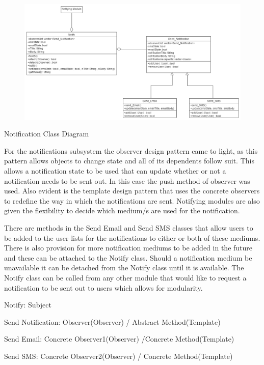 \documentclass{article}
\begin{document}
    \begin{figure}[h!]
      \includegraphics[width=\textwidth]{Notifications_Class_Diagram.png}
    \end{figure}
    Notification Class Diagram
    
    \begin{flushleft}
    
        For the notifications subsystem the observer design pattern came to light, as this pattern allows objects to change state and all of its dependents follow suit. This allows a notification state to be used that can update whether or not a notification needs to be sent out. In this case the push method of observer was used. Also evident is the template design pattern that uses the concrete observers to redefine the way in which the notifications are sent. Notifying modules are also given the flexibility to decide which medium/s are used for the notification.
        
        \bigskip

        
        There are methods in the Send Email and Send SMS classes that allow users to be added to the user lists for the notifications to either or both of these mediums. There is also provision for more notification mediums to be added in the future and these can be attached to the Notify class. Should a notification medium be unavailable it can be detached from the Notify class until it is available. The Notify class can be called from any other module that would like to request a notification to be sent out to users which allows for modularity.
        
        \bigskip

        Notify: Subject
        

        Send Notification: Observer(Observer) / Abstract Method(Template)
        

        Send Email: Concrete Observer1(Observer) /Concrete Method(Template)
        

        Send SMS: Concrete Observer2(Observer) / Concrete Method(Template)
    
    \end{flushleft}
    
\end{document}
